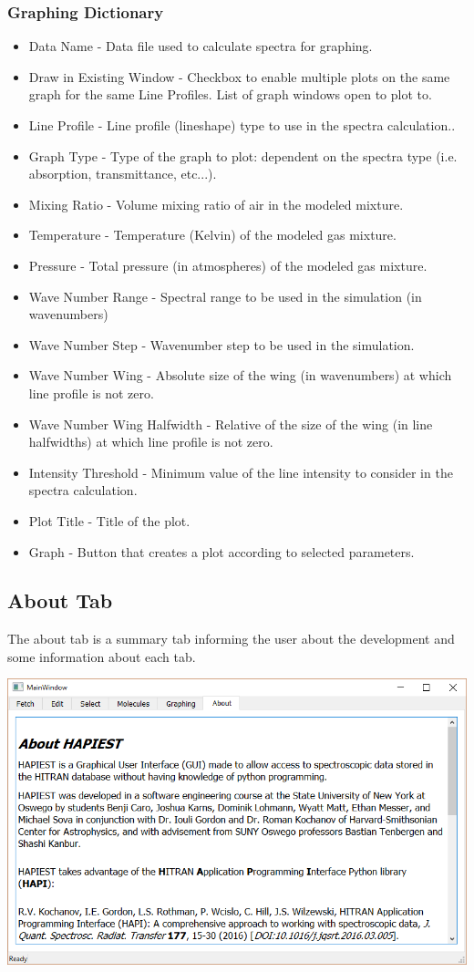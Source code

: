 \documentclass[12pt]{article}
\begin{document}
\subsubsection{Graphing Dictionary}
\begin{itemize}
\item Data Name - Data file used to calculate spectra for graphing.
\item Draw in Existing Window - Checkbox to enable multiple plots on the same graph for the same Line Profiles. List of graph windows open to plot to.
\item Line Profile - Line profile (lineshape) type to use in the spectra calculation..
\item Graph Type - Type of the graph to plot: dependent on the spectra type (i.e. absorption, transmittance, etc...).
\item Mixing Ratio - Volume mixing ratio of air in the modeled mixture.
\item Temperature - Temperature (Kelvin) of the modeled gas mixture.
\item Pressure - Total pressure (in atmospheres) of the modeled gas mixture.
\item Wave Number Range - Spectral range to be used in the simulation (in wavenumbers)
\item Wave Number Step - Wavenumber step to be used in the simulation.
\item Wave Number Wing - Absolute size of the wing (in wavenumbers) at which line profile is not zero.
\item Wave Number Wing Halfwidth - Relative of the size of the wing (in line halfwidths) at which line profile is not zero.
\item Intensity Threshold - Minimum value of the line intensity to consider in the spectra calculation.
\item Plot Title - Title of the plot.
\item Graph - Button that creates a plot according to selected parameters.
\end{itemize}

\subsection{About Tab}
The about tab is a summary tab informing the user about the development and some information about each tab.
\begin{center}
\includegraphics[scale = 0.5]{MainWindow_About}
\end{center}
\newpage
\end{document}

